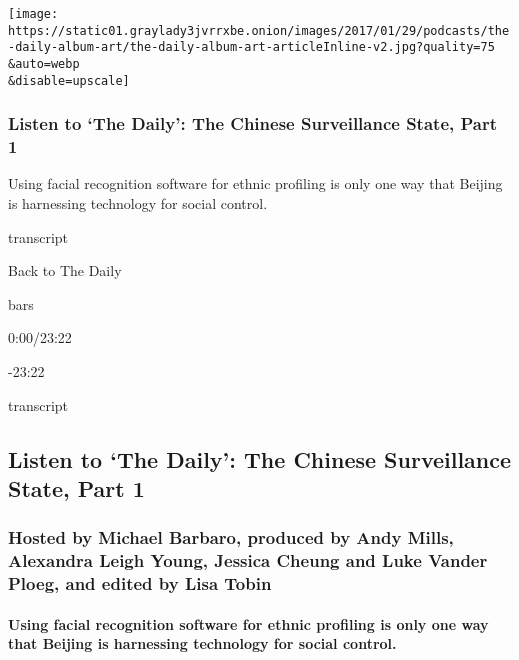 \texttt{[image: https://static01.graylady3jvrrxbe.onion/images/2017/01/29/podcasts/the-daily-album-art/the-daily-album-art-articleInline-v2.jpg?quality=75\\\&auto=webp\\\&disable=upscale]}

\hypertarget{listen-to-the-daily-the-chinese-surveillance-state-part-1}{%
\subsubsection{Listen to `The Daily': The Chinese Surveillance State,
Part
1}\label{listen-to-the-daily-the-chinese-surveillance-state-part-1}}

Using facial recognition software for ethnic profiling is only one way
that Beijing is harnessing technology for social control.

transcript

Back to The Daily

bars

0:00/23:22

-23:22

transcript

\hypertarget{listen-to-the-daily-the-chinese-surveillance-state-part-1-1}{%
\subsection{Listen to `The Daily': The Chinese Surveillance State, Part
1}\label{listen-to-the-daily-the-chinese-surveillance-state-part-1-1}}

\hypertarget{hosted-by-michael-barbaro-produced-by-andy-mills-alexandra-leigh-young-jessica-cheung-and-luke-vander-ploeg-and-edited-by-lisa-tobin}{%
\subsubsection{Hosted by Michael Barbaro, produced by Andy Mills,
Alexandra Leigh Young, Jessica Cheung and Luke Vander Ploeg, and edited
by Lisa
Tobin}\label{hosted-by-michael-barbaro-produced-by-andy-mills-alexandra-leigh-young-jessica-cheung-and-luke-vander-ploeg-and-edited-by-lisa-tobin}}

\hypertarget{using-facial-recognition-software-for-ethnic-profiling-is-only-one-way-that-beijing-is-harnessing-technology-for-social-control}{%
\paragraph{Using facial recognition software for ethnic profiling is
only one way that Beijing is harnessing technology for social
control.}\label{using-facial-recognition-software-for-ethnic-profiling-is-only-one-way-that-beijing-is-harnessing-technology-for-social-control}}

